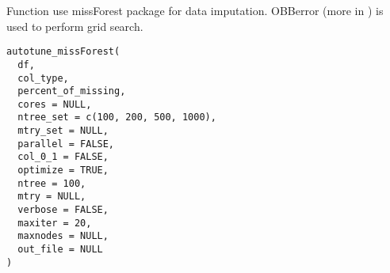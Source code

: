 \documentclass[letterpaper]{book}
\begin{document}
%
\begin{Description}\relax
Function use missForest package for data imputation. OBBerror (more in  ) is used to perform grid search.
\end{Description}
%
\begin{Usage}
\begin{verbatim}
autotune_missForest(
  df,
  col_type,
  percent_of_missing,
  cores = NULL,
  ntree_set = c(100, 200, 500, 1000),
  mtry_set = NULL,
  parallel = FALSE,
  col_0_1 = FALSE,
  optimize = TRUE,
  ntree = 100,
  mtry = NULL,
  verbose = FALSE,
  maxiter = 20,
  maxnodes = NULL,
  out_file = NULL
)
\end{verbatim}
\end{Usage}
%
\end{document}
